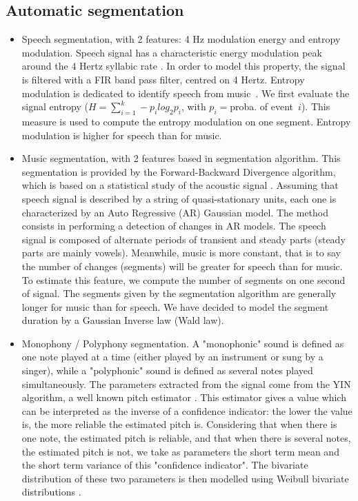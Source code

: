\documentclass{sig-alternate}
\begin{document}
\subsection{Automatic segmentation}
\begin{itemize} 

\item Speech segmentation, with 2 features: 4 Hz modulation energy and entropy modulation. 
Speech signal has a characteristic energy modulation peak around the 4 Hertz syllabic rate \cite{Houtgast1985}. In order to model this property, the signal is filtered with a FIR band pass filter, centred on 4 Hertz.
Entropy modulation is dedicated to identify speech from music~\cite{Pinquier2003}. We first evaluate the signal entropy ($H=\sum_{i=1}^{k}-p_ilog_2p_i$, with $p_i=$proba. of event~$i$). This measure is used to compute the entropy modulation on one segment. Entropy modulation is higher for speech than for music.

\item Music segmentation, with 2 features based in segmentation algorithm. 
This segmentation is provided by the Forward-Backward Divergence algorithm, which is based on a statistical study of the acoustic signal \cite{Obrecht1988}. Assuming that speech signal is described by a string of quasi-stationary units, each one is characterized by an Auto Regressive (AR) Gaussian model. The method consists in performing a detection of changes in AR models. 
The speech signal is composed of alternate periods of transient and steady parts (steady parts are mainly vowels). Meanwhile, music is more constant, that is to say the number of changes (segments) will be greater for speech than for music. To estimate this feature, we compute the number of segments on one second of signal. 
The segments given by the segmentation algorithm are generally longer for music than for speech. We have decided to model the segment duration by a Gaussian Inverse law (Wald law).

\item Monophony / Polyphony segmentation.
A "monophonic" sound is defined as one note played at a time (either played by an instrument or sung by a singer), while a "polyphonic" sound is defined as several notes played simultaneously. The parameters extracted from the signal come from the YIN algorithm, a well known pitch estimator \cite{DeCheveigne2002}. This estimator gives a value which can be interpreted as the inverse of a confidence indicator: the lower the value is, the more reliable the estimated pitch is. Considering that when there is one note, the estimated pitch is reliable, and that when there is several notes, the estimated pitch is not, we take as parameters the short term mean and the short term variance of this "confidence indicator". The bivariate distribution of these two parameters is then modelled using Weibull bivariate distributions \cite{Lachambre2011}.

\end{itemize} 
\end{document}
